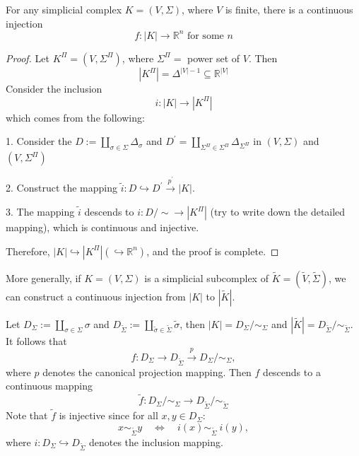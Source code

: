 \begin{proposition} For any simplicial complex \(K = \left( {V,\Sigma }\right)\), where \(V\) is finite, there is a continuous injection
\[
f: \left| K\right|  \rightarrow  {\mathbb{R}}^{n}\text{ for some }n
\]
\end{proposition}

\begin{proof} Let \(K^{\Pi} = \left( {V,\Sigma^{\Pi}}\right)\), where \(\Sigma^{\Pi} =\) power set of \(V\). Then
\[
\left| K^{\Pi}\right|  = {\Delta }^{\left| V\right|  - 1} \subseteq  {\mathbb{R}}^{\left| V\right| }
\]
Consider the inclusion
\[
i: \left| K\right|  \rightarrow  \left| K^{\Pi}\right|
\]
which comes from the following:

1. Consider the \(D \mathrel{\text{:= }} \mathop{\coprod }\limits_{{\sigma  \in  \Sigma }}{\Delta }_{\sigma }\) and \({D}^{\prime } = \mathop{\coprod }\limits_{{\Sigma^{\Pi} \in  \Sigma^{\Pi}}}{\Delta }_{\Sigma^{\Pi}}\) in \(\left( {V,\Sigma }\right)\) and \(\left( {V,\Sigma^{\Pi}}\right)\)

2. Construct the mapping \(\widetilde{i}: D \hookrightarrow  {D}^{\prime }\overset{{p}^{\prime }}{ \rightarrow  }\left| K\right|\).

3. The mapping \(\widetilde{i}\) descends to \(i: D/ \sim   \rightarrow  \left| K^{\Pi}\right|\) (try to write down the detailed mapping), which is continuous and injective.

Therefore, \(\left| K\right|  \hookrightarrow  \left| K^{\Pi}\right|  (\hookrightarrow  {\mathbb{R}}^{n})\), and the proof is complete.
\end{proof}

\begin{remark} 
More generally, if \(K = \left( V,\Sigma \right)\) is a simplicial subcomplex of \(\widetilde{K} = \left( {\widetilde{V},\widetilde{\Sigma}}\right)\), we can construct a continuous injection from \(\left| K\right|\) to \(\left| \widetilde{K}\right|\).

Let \({D}_{\Sigma } \mathrel{\text{:= }} \mathop{\coprod }\limits_{{\sigma  \in  \Sigma }}\sigma\) and \({D}_{\widetilde{\Sigma}} \mathrel{\text{:= }} \mathop{\coprod }\limits_{{\widetilde{\sigma} \in  \widetilde{\Sigma}}}\widetilde{\sigma}\), then \(\left| K\right|  = {D}_{\Sigma }/{ \sim  }_{\Sigma }\) and \(\left| \widetilde{K}\right|  = {D}_{\widetilde{\Sigma}}/{ \sim  }_{\widetilde{\Sigma}}\). It follows that
\[f:  {D}_{\Sigma } \rightarrow {D}_{\widetilde{\Sigma}} 
\overset{p}{ \rightarrow  }{D}_{\Sigma }/{ \sim  }_{\Sigma },\] 
where $p$ denotes the canonical projection mapping. Then \(f\) descends to a continuous mapping
\[
\widetilde{f}: {D}_{\Sigma }/{ \sim  }_{\Sigma } \rightarrow {D}_{\widetilde{\Sigma}}/{ \sim  }_{\widetilde{\Sigma}}
\]
Note that \(\widetilde{f}\) is injective since for all $x,y \in  {D}_{\Sigma }$:
\[
x{ \sim  }_{\widetilde{\Sigma}}y \quad \Leftrightarrow  \quad i\left( x\right) { \sim  }_{\widetilde{\Sigma}}\ i\left( y\right),
\]
where \(i: D_{\Sigma} \hookrightarrow D_{\widetilde{\Sigma}}\) denotes the inclusion mapping.
\end{remark}


